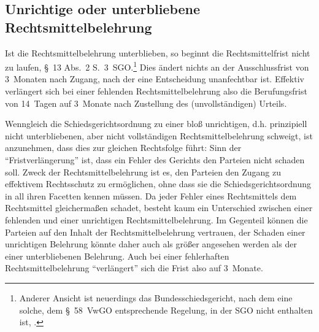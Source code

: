 \subsection{Unrichtige oder unterbliebene Rechtsmittelbelehrung}
Ist die Rechtsmittelbelehrung unterblieben, so beginnt die Rechtsmittelfrist nicht zu laufen, \S~13 Abs.~2 S.~3~SGO.\footnote{Anderer Ansicht ist neuerdings das Bundesschiedsgericht, nach dem eine solche, dem §~58~VwGO entsprechende Regelung, in der SGO nicht enthalten ist, \cite{BSGPP100132493}.}
Dies ändert nichts an der Ausschlussfrist von 3~Monaten nach Zugang, nach der eine Entscheidung unanfechtbar ist.
Effektiv verlängert sich bei einer fehlenden Rechtsmittelbelehrung also die Berufungsfrist von 14~Tagen auf 3~Monate nach Zustellung des (unvollständigen) Urteils.

Wenngleich die Schiedsgerichtsordnung zu einer bloß unrichtigen, d.h. prinzipiell nicht unterbliebenen, aber nicht vollständigen Rechtsmittelbelehrung schweigt, ist anzunehmen, dass dies zur gleichen Rechtsfolge führt:
Sinn der \enquote{Fristverlängerung} ist, dass ein Fehler des Gerichts den Parteien nicht schaden soll.
Zweck der Rechtsmittelbelehrung ist es, den Parteien den Zugang zu effektivem Rechtsschutz zu ermöglichen, ohne dass sie die Schiedsgerichtsordnung in all ihren Facetten kennen müssen.
Da jeder Fehler eines Rechtsmittels dem Rechtsmittel gleichermaßen schadet, besteht kaum ein Unterschied zwischen einer fehlenden und einer unrichtigen Rechtsmittelbelehrung.
Im Gegenteil können die Parteien auf den Inhalt der Rechtsmittelbelehrung vertrauen, der Schaden einer unrichtigen Belehrung könnte daher auch als größer angesehen werden als der einer unterbliebenen Belehrung.
Auch bei einer fehlerhaften Rechtsmittelbelehrung \enquote{verlängert} sich die Frist also auf 3~Monate.


